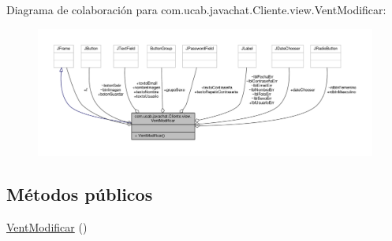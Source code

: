 Diagrama de colaboración para com.\-ucab.\-javachat.\-Cliente.\-view.\-Vent\-Modificar\-:
\nopagebreak
\begin{figure}[H]
\begin{center}
\leavevmode
\includegraphics[width=350pt]{df/d1c/classcom_1_1ucab_1_1javachat_1_1_cliente_1_1view_1_1_vent_modificar__coll__graph}
\end{center}
\end{figure}
\subsection*{Métodos públicos}
\begin{DoxyCompactItemize}
\item 
\hyperlink{classcom_1_1ucab_1_1javachat_1_1_cliente_1_1view_1_1_vent_modificar_a59e6db88994574f70aae82d250a847cb}{Vent\-Modificar} ()
\end{DoxyCompactItemize}
